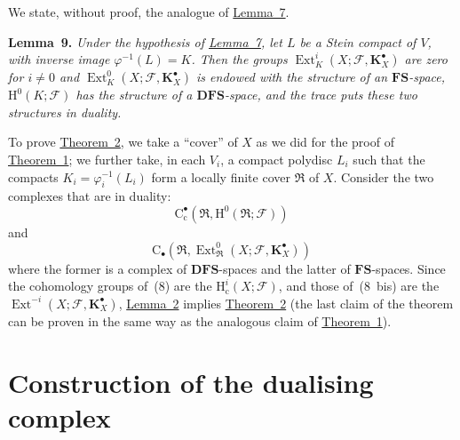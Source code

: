 \documentclass[british]{article}
\newenvironment{itenv}[1]
  {\phantomsection\par\smallskip\noindent\textbf{#1.}\itshape}
  {\par\smallskip}
\newcommand{\oldpage}[1]{\marginpar{\footnotesize$\Big\vert$ \textit{p.~#1}}}
\begin{document}
We state, without proof, the analogue of \hyperref[lemma-7]{Lemma~7}.

\protect{}\label{lemma-9}
\begin{itenv}{Lemma 9}
Under the hypothesis of \hyperref[lemma-7]{Lemma~7}, let \(L\) be a
Stein compact of \(V\), with inverse image \(\varphi^{-1}(L)=K\). Then
the groups
\(\operatorname{Ext}_K^i(X;{\mathscr{F}},\mathbf{K}_X^\bullet)\) are
zero for \(i\neq0\) and
\(\operatorname{Ext}_K^0(X;{\mathscr{F}},\mathbf{K}_X^\bullet)\) is
endowed with the structure of an \(\mathbf{FS}\)-space,
\(\mathrm{H}^0(K;{\mathscr{F}})\) has the structure of a
\(\mathbf{DFS}\)-space, and the trace puts these two structures in
duality.

\end{itenv}

To prove \hyperref[theorem-2]{Theorem~2}, we take a ``cover'' of \(X\)
as we did for the proof of \hyperref[theorem-1]{Theorem~1}; \oldpage{84}
we further take, in each \(V_i\), a compact polydisc \(L_i\) such that
the compacts \(K_i=\varphi_i^{-1}(L_i)\) form a locally finite cover
\({\mathfrak{R}}\) of \(X\). Consider the two complexes that are in
duality: \[
  \mathrm{C}_\mathrm{c}^\bullet({\mathfrak{R}},\mathrm{H}^0({\mathfrak{R}};{\mathscr{F}}))
\tag{8}
\] and \[
  \mathrm{C}_\bullet({\mathfrak{R}},\operatorname{Ext}_{\mathfrak{R}}^0(X;{\mathscr{F}},\mathbf{K}_X^\bullet))
\tag{8~bis}
\] where the former is a complex of \(\mathbf{DFS}\)-spaces and the
latter of \(\mathbf{FS}\)-spaces. Since the cohomology groups of~(8) are
the \(\mathrm{H}_\mathrm{c}^i(X;{\mathscr{F}})\), and those of~(8~bis)
are the
\(\operatorname{Ext}^{-i}(X;{\mathscr{F}},\mathbf{K}_X^\bullet)\),
\hyperref[lemma-2]{Lemma~2} implies \hyperref[theorem-2]{Theorem~2} (the
last claim of the theorem can be proven in the same way as the analogous
claim of \hyperref[theorem-1]{Theorem~1}).

\section{Construction of the dualising complex}\label{section-5}
\end{document}
